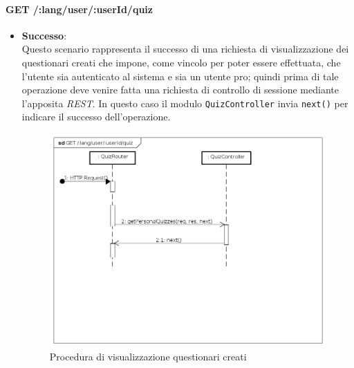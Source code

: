 \paragraph{GET /:lang/user/:userId/quiz} %
\begin{itemize}
\item \textbf{Successo}:\\
Questo scenario rappresenta il successo di una richiesta di visualizzazione dei questionari creati che impone, come vincolo per poter essere effettuata, che l'utente sia autenticato al sistema e sia un utente pro; quindi prima di tale operazione deve venire fatta una richiesta di controllo di sessione mediante l'apposita \textit{REST}. In questo caso il modulo \texttt{QuizController} invia \texttt{next()} per indicare il successo dell'operazione.
\label{Procedura di visualizzazione questionari creati}
\begin{figure}[ht]
	\centering
	\includegraphics[scale=0.40]{UML/DiagrammiDiSequenza/Back-end/GET__lang_user_userId_quiz_success.png}
	\caption{Procedura di visualizzazione questionari creati}
\end{figure}
\FloatBarrier


\end{itemize}
